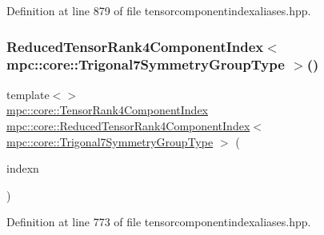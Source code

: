 Definition at line 879 of file tensorcomponentindexaliases.\+hpp.

\mbox{\label{namespacempc_1_1core_a156205a65087ea1d9c9fb9dbcd1578a6}} 
\subsubsection{\texorpdfstring{Reduced\+Tensor\+Rank4\+Component\+Index$<$ mpc\+::core\+::\+Trigonal7\+Symmetry\+Group\+Type $>$()}{ReducedTensorRank4ComponentIndex< mpc::core::Trigonal7SymmetryGroupType >()}}
{\footnotesize\ttfamily template$<$$>$ \\
\mbox{\hyperlink{namespacempc_1_1core_a54c081f41b2475abd10182bf023805d2}{mpc\+::core\+::\+Tensor\+Rank4\+Component\+Index}} \mbox{\hyperlink{namespacempc_1_1core_ae67b259d682419c12fa2e072049d20ad}{mpc\+::core\+::\+Reduced\+Tensor\+Rank4\+Component\+Index}}$<$ \mbox{\hyperlink{structmpc_1_1core_1_1_trigonal7_symmetry_group_type}{mpc\+::core\+::\+Trigonal7\+Symmetry\+Group\+Type}} $>$ (\begin{DoxyParamCaption}\item[{const \mbox{\hyperlink{namespacempc_1_1core_a54c081f41b2475abd10182bf023805d2}{mpc\+::core\+::\+Tensor\+Rank4\+Component\+Index}} \&}]{indexn }\end{DoxyParamCaption})\hspace{0.3cm}{\ttfamily [inline]}}



Definition at line 773 of file tensorcomponentindexaliases.\+hpp.

\mbox{\label{namespacempc_1_1core_a3963b11549140e877c6b7d3f74382af0}} 
